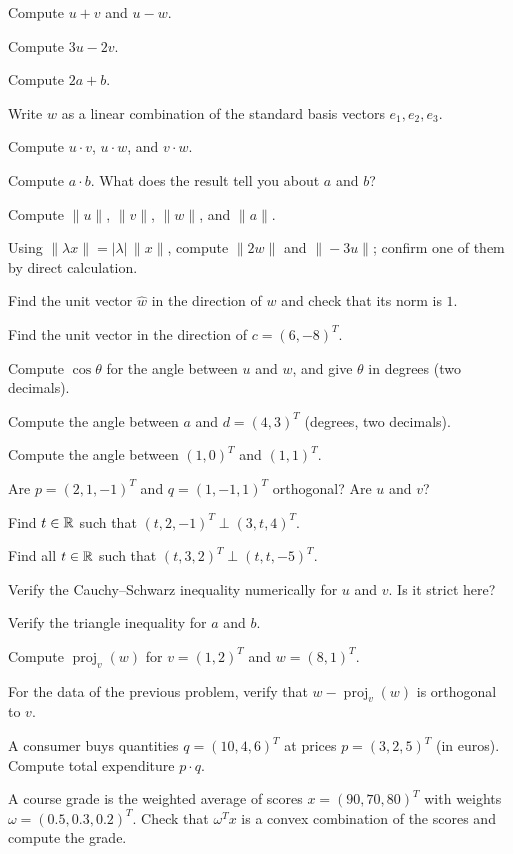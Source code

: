 \begin{problems}
  \item Compute $u + v$ and $u - w$.
  \item Compute $3 u - 2 v$.
  \item Compute $2 a + b$.
  \item Write $w$ as a linear combination of the standard basis vectors $e_{1}, e_{2}, e_{3}$.
  \item Compute $u \cdot v$, $u \cdot w$, and $v \cdot w$.
  \item Compute $a \cdot b$. What does the result tell you about $a$ and $b$?
  \item Compute $\|u\|$, $\|v\|$, $\|w\|$, and $\|a\|$.
  \item Using $\|\lambda x\| = |\lambda| \, \|x\|$, compute $\|2 w\|$ and $\|-3 u\|$; confirm one of them by direct calculation.
  \item Find the unit vector $\hat{w}$ in the direction of $w$ and check that its norm is $1$.
  \item Find the unit vector in the direction of $c = (6, -8)^{T}$.
  \item Compute $\cos \theta$ for the angle between $u$ and $w$, and give $\theta$ in degrees (two decimals).
  \item Compute the angle between $a$ and $d = (4, 3)^{T}$ (degrees, two decimals).
  \item Compute the angle between $(1, 0)^{T}$ and $(1, 1)^{T}$.
  \item Are $p = (2, 1, -1)^{T}$ and $q = (1, -1, 1)^{T}$ orthogonal? Are $u$ and $v$?
  \item Find $t \in \mathbb{R}$ such that $(t, 2, -1)^{T} \perp (3, t, 4)^{T}$.
  \item Find all $t \in \mathbb{R}$ such that $(t, 3, 2)^{T} \perp (t, t, -5)^{T}$.
  \item Verify the Cauchy--Schwarz inequality numerically for $u$ and $v$. Is it strict here?
  \item Verify the triangle inequality for $a$ and $b$.
  \item Compute $\operatorname{proj}_{v}(w)$ for $v = (1, 2)^{T}$ and $w = (8, 1)^{T}$.
  \item For the data of the previous problem, verify that $w - \operatorname{proj}_{v}(w)$ is orthogonal to $v$.
  \item A consumer buys quantities $q = (10, 4, 6)^{T}$ at prices $p = (3, 2, 5)^{T}$ (in euros). Compute total expenditure $p \cdot q$.
  \item A course grade is the weighted average of scores $x = (90, 70, 80)^{T}$ with weights $\omega = (0.5, 0.3, 0.2)^{T}$. Check that $\omega^{T} x$ is a convex combination of the scores and compute the grade.
\end{problems}

